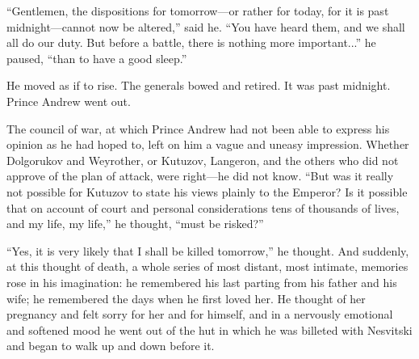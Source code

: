 ``Gentlemen, the dispositions for tomorrow---or rather for today,
for it is past midnight---cannot now be altered,'' said he. ``You
have heard them, and we shall all do our duty. But before a
battle, there is nothing more important...'' he paused, ``than to
have a good sleep.''

He moved as if to rise. The generals bowed and retired. It was
past midnight. Prince Andrew went out.

The council of war, at which Prince Andrew had not been able to
express his opinion as he had hoped to, left on him a vague and
uneasy impression. Whether Dolgorukov and Weyrother, or Kutuzov,
Langeron, and the others who did not approve of the plan of
attack, were right---he did not know. ``But was it really not
possible for Kutuzov to state his views plainly to the Emperor?
Is it possible that on account of court and personal
considerations tens of thousands of lives, and my life, my
life,'' he thought, ``must be risked?''

``Yes, it is very likely that I shall be killed tomorrow,'' he
thought.  And suddenly, at this thought of death, a whole series
of most distant, most intimate, memories rose in his imagination:
he remembered his last parting from his father and his wife; he
remembered the days when he first loved her. He thought of her
pregnancy and felt sorry for her and for himself, and in a
nervously emotional and softened mood he went out of the hut in
which he was billeted with Nesvitski and began to walk up and
down before it.

